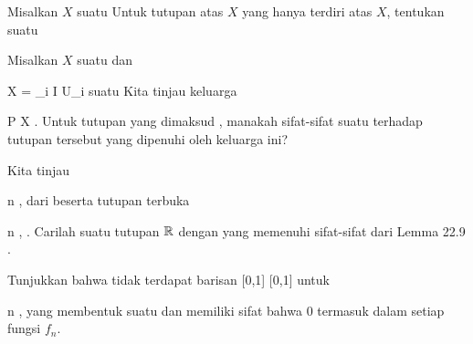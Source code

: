{}
{

Misalkan $X$ suatu
Untuk tutupan atas $X$ yang hanya terdiri atas $X$, tentukan suatu

}
{} {}

{}
{

Misalkan $X$ suatu
dan

\mavergleichskette
{\vergleichskette
{ X
}
{ = }{ \bigcup_{i \in I} U_i
}
{  }{
}
{    }{
}
{   }{
}
}
{}{}{}
suatu
Kita tinjau keluarga

 {}
 {P \in X} {}
 {} {} {} {.}
Untuk tutupan yang dimaksud
 {}{}{,}
manakah sifat-sifat suatu
terhadap tutupan tersebut yang dipenuhi oleh keluarga ini?

}
{} {}

{}
{

Kita tinjau

 {}
 {n \in \N} {}
 {} {} {} {,} dari
beserta tutupan terbuka

 {}
 {n \in \N} {}
 {} {} {} {,}
 {} {.}
Carilah suatu tutupan ${\mathbb R}$ dengan
yang memenuhi sifat-sifat
dari Lemma 22.9
 {} {}.

}
{} {}

{}
{

Tunjukkan bahwa tidak terdapat barisan
 { [0,1] } { [0,1]
} {}
untuk

\mavergleichskette
{\vergleichskette
{ n
}
{ \in }{ \N
}
{  }{
}
{    }{
}
{   }{
}
}
{}{}{,}
yang membentuk suatu
dan memiliki sifat bahwa $0$ termasuk dalam
setiap fungsi $f_n$.

}
{} {}

